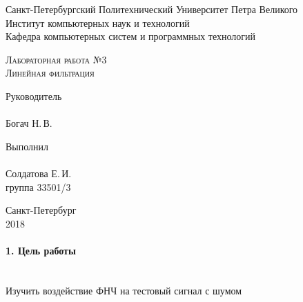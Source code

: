 \documentclass[12pt,a4paper]{report}
\begin{document}
\begin{titlepage}
\newpage
  \begin{center}
     
    Санкт-Петербургский Политехнический Университет Петра Великого \\
    
    Институт компьютерных наук и технологий \\
    
    Кафедра компьютерных систем и программных технологий
    \end{center}
    
    \vspace{15em}
    \begin{center}
    \textsc{Лабораторная работа №3}\\
    \vspace{5mm}
    \textsc{Линейная фильтрация}
    	
   \end{center}
\vspace{10em}

\newlength{\ML}
\hfill\begin{minipage}{0.45\textwidth}
\vfill
  Руководитель \\
  \\
  \underline{\hspace{\ML}} Богач Н.\,В.\\
 
\end{minipage}%
\bigskip

\hfill\begin{minipage}{0.45\textwidth}
  Выполнил\\
  \\
  \underline{\hspace{\ML}} Солдатова Е.\,И.\\
  группа 33501/3
\end{minipage}%

\vspace{\fill}
\begin{center}
    
  Санкт-Петербург\\
   2018 
\end{center}
\end{titlepage}

\paragraph{1. Цель работы\\\\}
Изучить воздействие ФНЧ на тестовый сигнал с шумом
\end{document}
